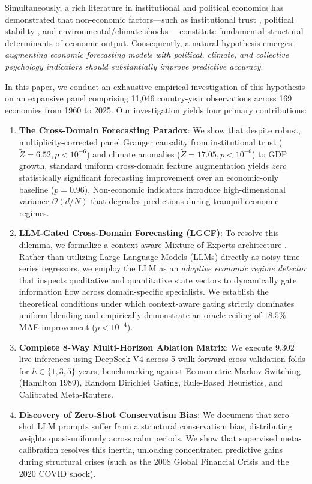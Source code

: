 \documentclass[11pt,a4paper]{article}
\begin{document}
Simultaneously, a rich literature in institutional and political economics has demonstrated that non-economic factors---such as institutional trust \citep{knack1997, algan2010}, political stability \citep{acemoglu2001, acemoglu2005}, and environmental/climate shocks \citep{burke2015}---constitute fundamental structural determinants of economic output. Consequently, a natural hypothesis emerges: \textit{augmenting economic forecasting models with political, climate, and collective psychology indicators should substantially improve predictive accuracy}.

In this paper, we conduct an exhaustive empirical investigation of this hypothesis on an expansive panel comprising 11,046 country-year observations across 169 economies from 1960 to 2025. Our investigation yields four primary contributions:

\begin{enumerate}
    \item \textbf{The Cross-Domain Forecasting Paradox}: We show that despite robust, multiplicity-corrected panel Granger causality from institutional trust ($\tilde{Z} = 6.52, p < 10^{-6}$) and climate anomalies ($\tilde{Z} = 17.05, p < 10^{-6}$) to GDP growth, standard uniform cross-domain feature augmentation yields \textit{zero} statistically significant forecasting improvement over an economic-only baseline ($p = 0.96$). Non-economic indicators introduce high-dimensional variance $\mathcal{O}(d / N)$ that degrades predictions during tranquil economic regimes.
    \item \textbf{LLM-Gated Cross-Domain Forecasting (LGCF)}: To resolve this dilemma, we formalize a context-aware Mixture-of-Experts architecture \citep{jacobs1991}. Rather than utilizing Large Language Models (LLMs) directly as noisy time-series regressors, we employ the LLM as an \textit{adaptive economic regime detector} that inspects qualitative and quantitative state vectors to dynamically gate information flow across domain-specific specialists. We establish the theoretical conditions under which context-aware gating strictly dominates uniform blending and empirically demonstrate an oracle ceiling of $18.5\%$ MAE improvement ($p < 10^{-4}$).
    \item \textbf{Complete 8-Way Multi-Horizon Ablation Matrix}: We execute 9,302 live inferences using DeepSeek-V4 across 5 walk-forward cross-validation folds for $h \in \{1, 3, 5\}$ years, benchmarking against Econometric Markov-Switching (Hamilton 1989), Random Dirichlet Gating, Rule-Based Heuristics, and Calibrated Meta-Routers.
    \item \textbf{Discovery of Zero-Shot Conservatism Bias}: We document that zero-shot LLM prompts suffer from a structural conservatism bias, distributing weights quasi-uniformly across calm periods. We show that supervised meta-calibration resolves this inertia, unlocking concentrated predictive gains during structural crises (such as the 2008 Global Financial Crisis and the 2020 COVID shock).
\end{enumerate}
\end{document}

